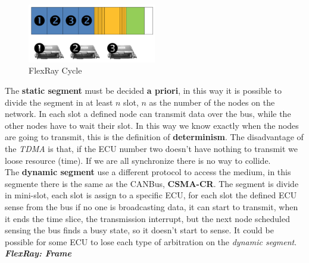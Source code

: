 \begin{figure}[h]
    \centering
    \label{fig:flexray_tdma}
    \includegraphics[width=0.5\textwidth]{img/flexray_tdma}
    \caption{FlexRay Cycle}
\end{figure}
The \textbf{static segment} must be decided \textbf{a priori}, in this way it is possible to divide the segment in at least $n$ slot, $n$ as the number of the nodes on the network. In each slot a defined node can transmit data over the bus, while the other nodes have to wait their slot. In this way we know exactly when the nodes are going to transmit, this is the definition of \textbf{determinism}. The disadvantage of the \textit{TDMA} is that, if the ECU number two doesn't have nothing to transmit we loose resource (time). If we are all synchronize there is no way to collide. \\
The \textbf{dynamic segment} use a different protocol to access the medium, in this segmente there is the same as the CANBus, \textbf{CSMA-CR}. The segment is divide in mini-slot, each slot is assign to a specific ECU, for each slot the defined ECU sense from the bus if no one is broadcasting data, it can start to transmit, when it ends the time slice, the transmission interrupt, but the next node scheduled sensing the bus finds a busy state, so it doesn't start to sense. It could be possible for some ECU to lose each type of arbitration on the \textit{dynamic segment}. \\ \newline
\textbf{\textit{FlexRay: Frame}}

